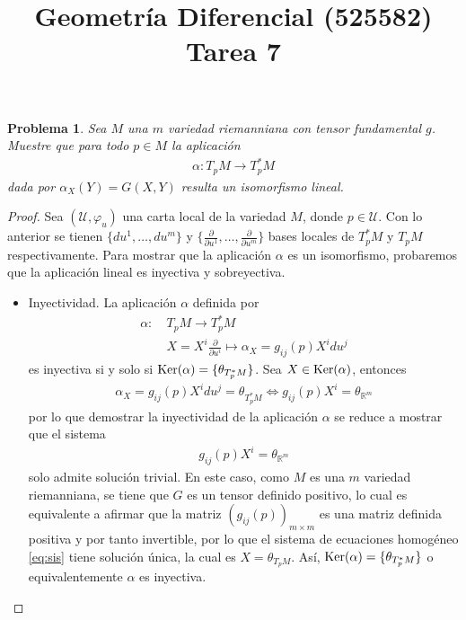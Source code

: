 \documentclass[10pt,a4paper]{report}
\title{\color{azul}\textbf{Geometría Diferencial (525582)}\\
\textbf{Tarea 7}}
\author{\color{azul}\autor}
\date{\color{azul}\fecha}
\newtheorem{pro}{Problema}
\begin{document}
\maketitle
	\begin{pro}\upshape
	Sea $M$ una $m$ variedad riemanniana con tensor fundamental $g$. Muestre que para todo $p\in M$ la aplicación
	\begin{align*}
		\alpha : T_{p}M  \longrightarrow T^{*}_{p}M
	\end{align*} 
	dada por $\alpha_{X}(Y) = G(X,Y)$ resulta un isomorfismo lineal.
\end{pro}
\begin{proof}
	Sea $(\mathcal{U},\varphi_{u})$ una carta local de la variedad $M$, donde $p\in \mathcal{U}$. Con lo anterior se tienen $\{du^{1},\dots,du^{m}\}$ y $\{\frac{\partial}{\partial u^{1}},\dots,\frac{\partial}{\partial u^{m}}\}$ bases locales de $T^{*}_{p}M$ y $T_{p}M$ respectivamente.
	Para mostrar que la aplicación $\alpha$ es un isomorfismo, probaremos que la aplicación lineal es inyectiva y sobreyectiva.
	\begin{itemize}
		\item Inyectividad.
		La aplicación $\alpha$ definida por
		\begin{align*}
			\alpha :\  &T_{p}M  \longrightarrow T^{*}_{p}M\\
			&X = X^{i}\frac{\partial}{\partial u^{i}} \mapsto \alpha_{X} = g_{ij}(p)X^{i}du^{j}
		\end{align*}
		es inyectiva si y solo si $\textup{Ker}(\alpha) = \{\theta_{T^{*}_{p}M}\}$. Sea $X\in \textup{Ker}(\alpha)$, entonces
		\begin{align*}
			\alpha_{X} = g_{ij}(p)X^{i}du^{j} = \theta_{T^{*}_{p}M}\iff g_{ij}(p)X^{i} = \theta_{\mathbb{R}^{m}}
		\end{align*}
	por lo que demostrar la inyectividad de la aplicación $\alpha$ se reduce a mostrar que el sistema 
	\begin{align}
		g_{ij}(p)X^{i} = \theta_{\mathbb{R}^{m}}\label{eq:sis}
	\end{align}
    solo admite solución trivial. En este caso, como $M$ es una $m$ variedad riemanniana, se tiene que $G$ es un tensor definido positivo, lo cual es equivalente a afirmar que la matriz $(g_{ij}(p))_{m\times m}$ es una matriz definida positiva y por tanto invertible, por lo que el sistema de ecuaciones homogéneo \eqref{eq:sis} tiene solución única, la cual es $X = \theta_{T_{p}M}$. Así, $\textup{Ker}(\alpha) = \{\theta_{T^{*}_{p}M}\}$ o equivalentemente $\alpha$ es inyectiva.

\end{itemize}
\end{proof}
\end{document}
